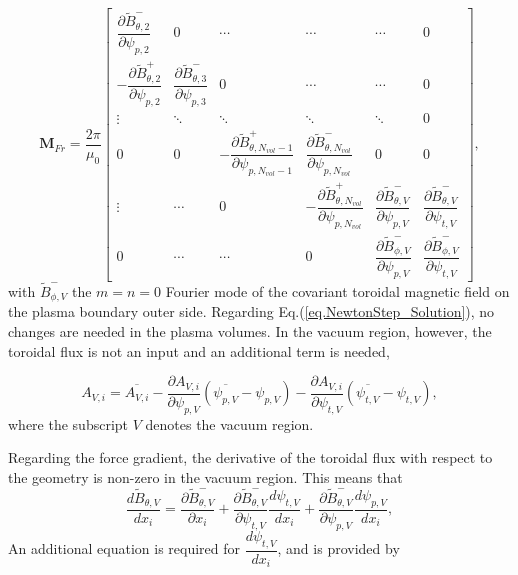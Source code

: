\begin{equation}
	\mathbf{M}_{Fr} = \frac{2\pi}{\mu_0} \begin{bmatrix}
		\dfrac{\partial \tilde{B}^-_{\theta,2}}{\partial{\psi_{p,2}}} & 0 & \cdots  & \cdots & \cdots & 0\\
		-\dfrac{\partial \tilde{B}^+_{\theta,2}}{\partial{\psi_{p,2}}} & \dfrac{\partial \tilde{B}^-_{\theta,3}}{\partial{\psi_{p,3}}} & 0  & \cdots & \cdots & 0\\
		\vdots  & \ddots  & \ddots & \ddots & \ddots & 0\\
		0 & 0 & -\dfrac{\partial \tilde{B}^+_{\theta,N_{vol}-1}}{\partial{\psi_{p,N_{vol}-1}}} & \dfrac{\partial \tilde{B}^-_{\theta,N_{vol}}}{\partial{\psi_{p,N_{vol}}}} & 0 & 0 \\
		\vdots & \cdots & 0 & -\dfrac{\partial \tilde{B}^+_{\theta,N_{vol}}}{\partial{\psi_{p,N_{vol}}}} & \dfrac{\partial \tilde{B}^-_{\theta,V}}{\partial{\psi_{p,V}}} & \dfrac{\partial \tilde{B}^-_{\theta,V}}{\partial{\psi_{t,V}}} \\
		0 & \cdots & \cdots & 0 & \dfrac{\partial \tilde{B}_{\phi,V}^-}{\partial \psi_{p,V}} & \dfrac{\partial \tilde{B}_{\phi,V}^-}{\partial \psi_{t,V}}
	\end{bmatrix},
\end{equation}
with $\tilde{B}^-_{\phi,V}$ the $m=n=0$ Fourier mode of the covariant toroidal magnetic field on the plasma boundary outer side. Regarding Eq.(\ref{eq.NewtonStep_Solution}), no changes are needed in the plasma volumes. In the vacuum region, however, the toroidal flux is not an input and an additional term is needed,

\begin{equation}
	A_{V,i} = \overbar{A_{V,i}} - \frac{\partial {A_{V,i}}}{\partial {\psi_{p,V}}} (\overbar{\psi_{p,V}} - \psi_{p,V}) - \frac{\partial {A_{V,i}}}{\partial {\psi_{t,V}}} (\overbar{\psi_{t,V}} - \psi_{t,V}),
\end{equation}
where the subscript $V$ denotes the vacuum region.

Regarding the force gradient, the derivative of the toroidal flux with respect to the geometry is non-zero in the vacuum region. This means that
\begin{equation}
	\frac{d\tilde{B}_{\theta,V}}{dx_i} = \frac{\partial \tilde{B}^-_{\theta,V}}{\partial x_i} + \frac{\partial \tilde{B}^-_{\theta,V}}{\partial \psi_{t,V}}\frac{d \psi_{t,V}}{d x_i} + \frac{\partial \tilde{B}^-_{\theta,V}}{\partial \psi_{p,V}}\frac{d \psi_{p,V}}{d x_i},
\end{equation}
An additional equation is required for $\dfrac{d\psi_{t,V}}{dx_i}$, and is provided by

